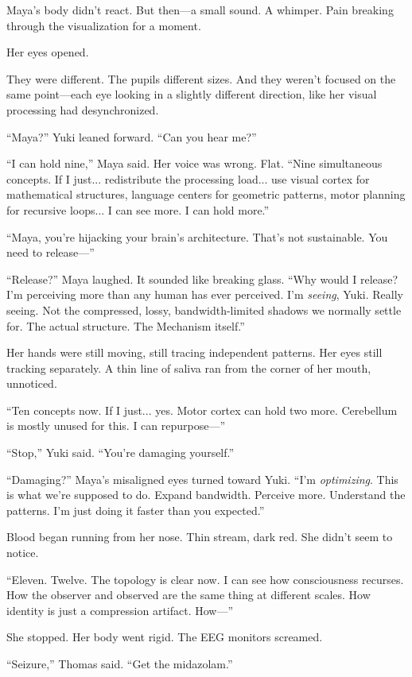 Maya's body didn't react. But then—a small sound. A whimper. Pain breaking through the visualization for a moment.

Her eyes opened.

They were different. The pupils different sizes. And they weren't focused on the same point—each eye looking in a slightly different direction, like her visual processing had desynchronized.

``Maya?'' Yuki leaned forward. ``Can you hear me?''

``I can hold nine,'' Maya said. Her voice was wrong. Flat. ``Nine simultaneous concepts. If I just... redistribute the processing load... use visual cortex for mathematical structures, language centers for geometric patterns, motor planning for recursive loops... I can see more. I can hold more.''

``Maya, you're hijacking your brain's architecture. That's not sustainable. You need to release—''

``Release?'' Maya laughed. It sounded like breaking glass. ``Why would I release? I'm perceiving more than any human has ever perceived. I'm \textit{seeing}, Yuki. Really seeing. Not the compressed, lossy, bandwidth-limited shadows we normally settle for. The actual structure. The Mechanism itself.''

Her hands were still moving, still tracing independent patterns. Her eyes still tracking separately. A thin line of saliva ran from the corner of her mouth, unnoticed.

``Ten concepts now. If I just... yes. Motor cortex can hold two more. Cerebellum is mostly unused for this. I can repurpose—''

``Stop,'' Yuki said. ``You're damaging yourself.''

``Damaging?'' Maya's misaligned eyes turned toward Yuki. ``I'm \textit{optimizing}. This is what we're supposed to do. Expand bandwidth. Perceive more. Understand the patterns. I'm just doing it faster than you expected.''

Blood began running from her nose. Thin stream, dark red. She didn't seem to notice.

``Eleven. Twelve. The topology is clear now. I can see how consciousness recurses. How the observer and observed are the same thing at different scales. How identity is just a compression artifact. How—''

She stopped. Her body went rigid. The EEG monitors screamed.

``Seizure,'' Thomas said. ``Get the midazolam.''

